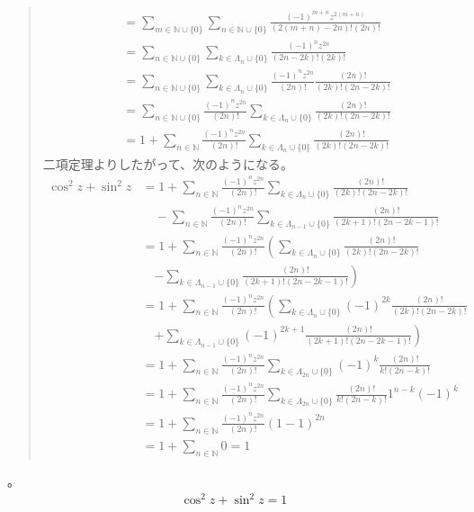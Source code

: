 \documentclass[dvipdfmx]{jsarticle}
\begin{document}
\begin{thm}
{\begin{quote}
\begin{align*}
  &=\sum_{m\in \mathbb{N} \cup \{ 0\} }\sum_{n\in \mathbb{N} \cup \{ 0\} }{\frac{(-1)^{m+n}z^{2(m+n)}}{(2(m+n)-2n)!(2n)!}}\\
  &=\sum_{n\in \mathbb{N} \cup \{ 0\} }\sum_{k\in \varLambda_n \cup \{ 0\} }{\frac{(-1)^{n}z^{2n}}{(2n-2k)!(2k)!}}\\
  &=\sum_{n\in \mathbb{N} \cup \{ 0\} }\sum_{k\in \varLambda_n \cup \{ 0\} }{\frac{(-1)^{n}z^{2n}}{(2n)!}}{\frac{(2n)!}{(2k)!(2n-2k)!}}\\
  &=\sum_{n\in \mathbb{N} \cup \{ 0\} }{\frac{(-1)^{n}z^{2n}}{(2n)!}}\sum_{k\in \varLambda_n \cup \{ 0\} }{\frac{(2n)!}{(2k)!(2n-2k)!}}\\
  &=1+\sum_{n\in \mathbb{N} }{\frac{(-1)^{n}z^{2n}}{(2n)!}}\sum_{k\in \varLambda_n \cup \{ 0\} }{\frac{(2n)!}{(2k)!(2n-2k)!}}
\end{align*}
二項定理よりしたがって、次のようになる。
\begin{align*}
  \cos^{2}z + \sin^{2}z &=1+\sum_{n\in \mathbb{N} }{\frac{(-1)^{n}z^{2n}}{(2n)!}}\sum_{k\in \varLambda_n \cup \{ 0\} }{\frac{(2n)!}{(2k)!(2n-2k)!}}\\
  &\quad -\sum_{n\in \mathbb{N}}\frac{(-1)^{n}z^{2n}}{(2n)!}\sum_{k\in \varLambda_{n-1} \cup \{ 0\} }\frac{(2n)!}{(2k+1)!(2n-2k-1)!} \\
  &=1+\sum_{n\in \mathbb{N} }{\frac{(-1)^{n}z^{2n}}{(2n)!}}\left( \sum_{k\in \varLambda_n \cup \{ 0\} }{\frac{(2n)!}{(2k)!(2n-2k)!}}\right. \\
  &\quad \left. -\sum_{k\in \varLambda_{n-1} \cup \{ 0\} }\frac{(2n)!}{(2k+1)!(2n-2k-1)!} \right)\\
  &=1+\sum_{n\in \mathbb{N} }{\frac{(-1)^{n}z^{2n}}{(2n)!}}\left( \sum_{k\in \varLambda_n \cup \{ 0\} }{(-1)^{2k}\frac{(2n)!}{(2k)!(2n-2k)!}} \right. \\
  &\quad \left. +\sum_{k\in \varLambda_{n-1} \cup \{ 0\} }(-1)^{2k+1}\frac{(2n)!}{(2k+1)!(2n-2k-1)!} \right)\\
  &=1+\sum_{n\in \mathbb{N} }{\frac{(-1)^{n}z^{2n}}{(2n)!}} \sum_{k\in \varLambda_{2n} \cup \{ 0\} }{(-1)^{k}\frac{(2n)!}{k!(2n-k)!}} \\
  &=1+\sum_{n\in \mathbb{N} }{\frac{(-1)^{n}z^{2n}}{(2n)!}} \sum_{k\in \varLambda_{2n} \cup \{ 0\} }{\frac{(2n)!}{k!(2n-k)!}1^{n-k}(-1)^{k}} \\
  &=1+\sum_{n\in \mathbb{N} }{\frac{(-1)^{n}z^{2n}}{(2n)!}} \left(1-1\right)^{2n} \\
  &=1+\sum_{n\in \mathbb{N} } 0=1
\end{align*}
\end{quote}}。
\begin{align*}
\cos^{2}z + \sin^{2}z = 1
\end{align*}
\end{thm}
\end{document}
